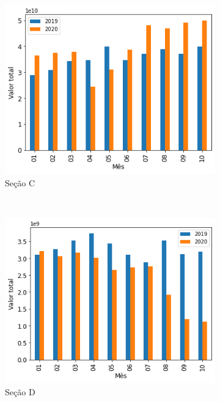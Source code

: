 \begin{figure}[htb]
    \begin{subfigure}[b]{0.45\textwidth}
        \includegraphics[scale=0.45]{images/base-de-dados-17.C-comparacao-valor-total-por-secao.png}
        \caption{Seção C}
        \label{fig:pandemia:descritiva-17.C-comparacao-valor-total-por-secao}
    \end{subfigure} ~ \quad
    \begin{subfigure}[b]{0.45\textwidth}
        \includegraphics[scale=0.45]{images/base-de-dados-17.D-comparacao-valor-total-por-secao.png}
        \caption{Seção D}
        \label{fig:pandemia:descritiva-17.D-comparacao-valor-total-por-secao}
    \end{subfigure} ~ \\
    \begin{subfigure}[b]{0.45\textwidth} 

\end{subfigure}
\end{figure}
